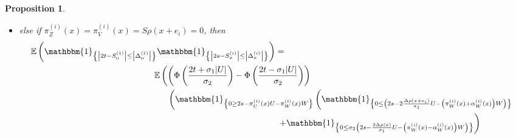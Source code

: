 \documentclass[12pt]{article}
\theoremstyle{Theorem}
\newtheorem{Proposition}[Theorem]{Proposition}
\begin{document}
\begin{Proposition}
\begin{itemize}
{\begin{align}
& \hspace{-5cm} + \mathbb{E}\left(\left(\Phi\left(\min\left(\frac{2t + \sigma_{1}|U|}{\sigma_{2}}, \frac{\sigma_{2}\left(2s -\frac{2\Delta\rho(x)}{\sigma_1}U - \left(\pi^{\scriptscriptstyle (i)}_{W}(x) - \alpha^{\scriptscriptstyle (i)}_{W}(x)\right)W\right)}{2S\rho(x)}\right)\right) - \Phi\left(\max\left(\frac{2t - \sigma_{1}|U|}{\sigma_{2}}, \frac{2s -   \pi^{\scriptscriptstyle (i)}_{U}(x)U - \pi^{\scriptscriptstyle (i)}_{W}(x)W}{\pi^{\scriptscriptstyle (i)}_{V}(x)}\right)\right)\right)\right.\\
& \hspace{-4.5cm}\left.\mathbbm{1}_{\left\{ \max\left(\frac{2t - \sigma_{1}|U|}{\sigma_{2}}, \frac{2s -   \pi^{\scriptscriptstyle (i)}_{U}(x)U - \pi^{\scriptscriptstyle (i)}_{W}(x)W}{\pi^{\scriptscriptstyle (i)}_{V}(x)}\right) \leq \min\left(\frac{2t + \sigma_{1}|U|}{\sigma_{2}}, \frac{\sigma_{2}\left(2s -\frac{2\Delta\rho(x)}{\sigma_1}U - \left(\pi^{\scriptscriptstyle (i)}_{W}(x) - \alpha^{\scriptscriptstyle (i)}_{W}(x)\right)W\right)}{2S\rho(x)}\right) \right\}}\right)
\end{align}}
\item else if $\pi^{\scriptscriptstyle(i)}_{Z}(x)= \pi^{\scriptscriptstyle (i)}_{V}(x) = S\rho(x+e_i) = 0$, then
{\tiny 
\begin{align*}
\mathbb{E}\left(\mathbbm{1}_{\left\{ \left|2t - S^{\scriptscriptstyle (1)}_{\scriptscriptstyle 0}\right| \leq \left|\Delta^{\scriptscriptstyle (1)}_{\scriptscriptstyle 0}\right|\right\}}\mathbbm{1}_{\left\{ \left|2s - S^{\scriptscriptstyle (i)}_{\scriptscriptstyle x}\right| \leq \left|\Delta^{\scriptscriptstyle (i)}_x\right| \right\}}\right) & = \\
& \hspace{-5cm} \mathbb{E}\left(\left(\Phi\left(\frac{2t + \sigma_{1}|U|}{\sigma_{2}}\right) - \Phi\left(\frac{2t - \sigma_{1}|U|}{\sigma_{2}} \right) \right)\right.\\
&\hspace{-4.5cm}  \left.\left(\mathbbm{1}_{\left\{ 0 \geq 2s -   \pi^{\scriptscriptstyle (i)}_{U}(x)U - \pi^{\scriptscriptstyle (i)}_{W}(x)W\right\}} \left(\mathbbm{1}_{\left\{ 0 \leq \left(2s - 2\frac{\Delta\rho(x+e_i)}{\sigma_1}U -  \left(\pi^{\scriptscriptstyle (i)}_{W}(x) + \alpha^{\scriptscriptstyle (i)}_{W}(x)\right)W\right) \right\}}\right.\right.\right.\\
& \left.\left. \left. + \mathbbm{1}_{\left\{ 0 \leq \sigma_{2}\left(2s -\frac{2\Delta\rho(x)}{\sigma_1}U - \left(\pi^{\scriptscriptstyle (i)}_{W}(x) - \alpha^{\scriptscriptstyle (i)}_{W}(x)\right)W\right)\right\}}\right)\right.\right.\\

\end{align*}}
\end{itemize}
\end{Proposition}
\end{document}
